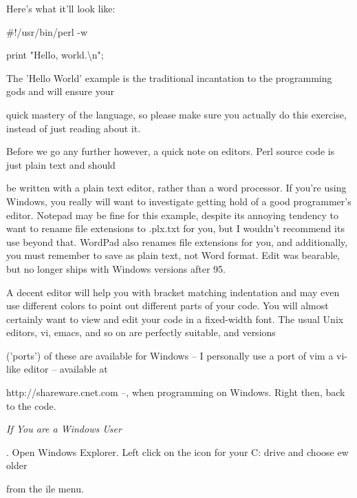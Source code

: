 \documentclass[a4paper,11pt]{book}
\begin{document}
\noindent 

\noindent Here's what it'll look like:

\noindent 

\noindent \#!/usr/bin/perl -w

\noindent 

\noindent print "Hello, world.\textbackslash n";

\noindent 

\noindent 

\noindent The 'Hello World' example is the traditional incantation to the programming gods and will ensure your

\noindent quick mastery of the language, so please make sure you actually do this exercise, instead of just reading about it.

\noindent 

\noindent Before we go any further however, a quick note on editors. Perl source code is just plain text and should

\noindent be written with a plain text editor, rather than a word processor. If you're using Windows, you really will want to investigate getting hold of a good programmer's editor. Notepad may be fine for this example, despite its annoying tendency to want to rename file extensions to .plx.txt for you, but I wouldn't recommend its use beyond that. WordPad also renames file extensions for you, and additionally, you must remember to save as plain text, not Word format. Edit was bearable, but no longer ships with Windows versions after 95.

\noindent 

\noindent A decent editor will help you with bracket matching indentation and may even use different colors to point out different parts of your code. You will almost certainly want to view and edit your code in a fixed-width font. The usual Unix editors, vi, emacs, and so on are perfectly suitable, and versions

\noindent ('ports') of these are available for Windows -- I personally use a port of vim a vi-like editor -- available at

\noindent http://shareware.cnet.com --, when programming on Windows. Right then, back to the code.

\noindent \textit{If You are a Windows User}

.   Open Windows Explorer. Left click on the icon for your C: drive and choose ew \textbar  {}older

\noindent from the ile menu.
\end{document}
